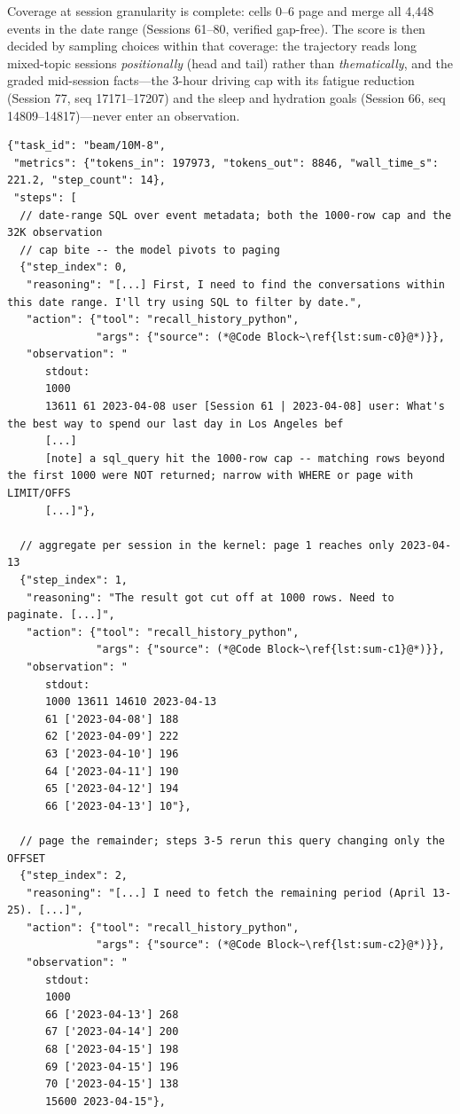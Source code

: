 Coverage at session granularity is complete: cells
0--6 page and merge all 4,448 events in the date range (Sessions 61--80,
verified gap-free). The score is then decided by sampling choices within that
coverage: the trajectory reads long mixed-topic sessions \emph{positionally}
(head and tail) rather than \emph{thematically}, and the graded mid-session
facts---the 3-hour driving cap with its fatigue reduction (Session 77, seq
17171--17207) and the sleep and hydration goals (Session 66, seq
14809--14817)---never enter an observation.

\begin{lstlisting}[style=traj]
{"task_id": "beam/10M-8",
 "metrics": {"tokens_in": 197973, "tokens_out": 8846, "wall_time_s": 221.2, "step_count": 14},
 "steps": [
  // date-range SQL over event metadata; both the 1000-row cap and the 32K observation
  // cap bite -- the model pivots to paging
  {"step_index": 0,
   "reasoning": "[...] First, I need to find the conversations within this date range. I'll try using SQL to filter by date.",
   "action": {"tool": "recall_history_python",
              "args": {"source": (*@Code Block~\ref{lst:sum-c0}@*)}},
   "observation": "
      stdout:
      1000
      13611 61 2023-04-08 user [Session 61 | 2023-04-08] user: What's the best way to spend our last day in Los Angeles bef
      [...]
      [note] a sql_query hit the 1000-row cap -- matching rows beyond the first 1000 were NOT returned; narrow with WHERE or page with LIMIT/OFFS
      [...]"},

  // aggregate per session in the kernel: page 1 reaches only 2023-04-13
  {"step_index": 1,
   "reasoning": "The result got cut off at 1000 rows. Need to paginate. [...]",
   "action": {"tool": "recall_history_python",
              "args": {"source": (*@Code Block~\ref{lst:sum-c1}@*)}},
   "observation": "
      stdout:
      1000 13611 14610 2023-04-13
      61 ['2023-04-08'] 188
      62 ['2023-04-09'] 222
      63 ['2023-04-10'] 196
      64 ['2023-04-11'] 190
      65 ['2023-04-12'] 194
      66 ['2023-04-13'] 10"},

  // page the remainder; steps 3-5 rerun this query changing only the OFFSET
  {"step_index": 2,
   "reasoning": "[...] I need to fetch the remaining period (April 13-25). [...]",
   "action": {"tool": "recall_history_python",
              "args": {"source": (*@Code Block~\ref{lst:sum-c2}@*)}},
   "observation": "
      stdout:
      1000
      66 ['2023-04-13'] 268
      67 ['2023-04-14'] 200
      68 ['2023-04-15'] 198
      69 ['2023-04-15'] 196
      70 ['2023-04-15'] 138
      15600 2023-04-15"},


\end{lstlisting}

